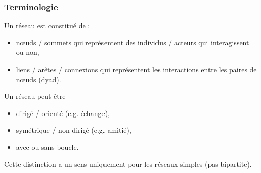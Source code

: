 \documentclass[nopagenumber,9pt]{beamer}
\begin{document}
\begin{frame}
 \frametitle{Terminologie}
 
 Un réseau est constitué de :
 \begin{itemize}
  \item n\oe uds / sommets qui représentent des individus / acteurs qui interagissent ou non,
  \item liens / ar\^etes / connexions qui représentent les interactions entre les paires de n\oe uds (dyad).
  
 \end{itemize}

\bigskip
 
Un réseau peut \^etre 
\begin{itemize}
  \item dirigé / orienté (e.g. échange),
  \item symétrique / non-dirigé (e.g. amitié),
  \item avec ou sans boucle.
 \end{itemize}

 Cette distinction a un sens uniquement pour les réseaux simples (pas bipartite).
 
 
\end{frame}
\end{document}
